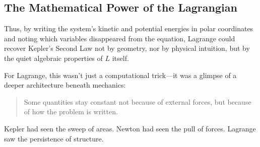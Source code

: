 \subsection{The Mathematical Power of the Lagrangian}

Thus, by writing the system’s kinetic and potential energies in polar coordinates and noting which variables disappeared from the equation, Lagrange could recover Kepler’s Second Law not by geometry, nor by physical intuition, but by the quiet algebraic properties of \( L \) itself.

For Lagrange, this wasn’t just a computational trick—it was a glimpse of a deeper architecture beneath mechanics:

\begin{quote}
Some quantities stay constant not because of external forces, but because of how the problem is written.
\end{quote}

Kepler had seen the sweep of areas.  
Newton had seen the pull of forces.  
Lagrange saw the persistence of structure.

